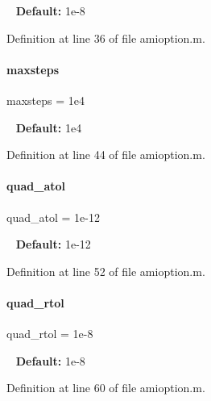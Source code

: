 ~\newline
{\bfseries Default\+:} 1e-\/8 

Definition at line 36 of file amioption.\+m.

\mbox{\label{classamioption_ac37622882dacee1f11688d4941ccb45e}} 
\paragraph{\texorpdfstring{maxsteps}{maxsteps}}
{\footnotesize\ttfamily maxsteps = 1e4}

~\newline
{\bfseries Default\+:} 1e4 

Definition at line 44 of file amioption.\+m.

\mbox{\label{classamioption_ad77eb68a40bc4659c33df68b373f3fd7}} 
\paragraph{\texorpdfstring{quad\+\_\+atol}{quad\_atol}}
{\footnotesize\ttfamily quad\+\_\+atol = 1e-\/12}

~\newline
{\bfseries Default\+:} 1e-\/12 

Definition at line 52 of file amioption.\+m.

\mbox{\label{classamioption_ae6739de7f62871e1b32700da8d8d4c2f}} 
\paragraph{\texorpdfstring{quad\+\_\+rtol}{quad\_rtol}}
{\footnotesize\ttfamily quad\+\_\+rtol = 1e-\/8}

~\newline
{\bfseries Default\+:} 1e-\/8 

Definition at line 60 of file amioption.\+m.

\mbox{\label{classamioption_aca33b56e266b489d1211688e3c223704}} 

